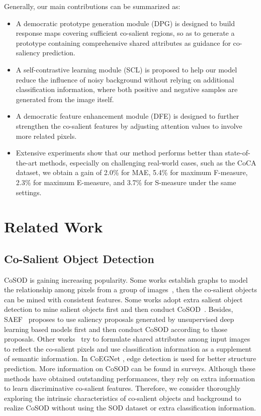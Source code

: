 \documentclass[10pt,twocolumn,letterpaper]{article}
\begin{document}
Generally, our main contributions can be summarized as:
\begin{itemize}
	\item A democratic prototype generation module (DPG) is designed to build response maps covering sufficient co-salient regions, so as to generate a prototype containing comprehensive shared attributes as guidance for co-saliency prediction.
	\item A self-contrastive learning module (SCL) is proposed to help our model reduce the influence of noisy background without relying on additional classification information, where both positive and negative samples are generated from the image itself.
	\item A democratic feature enhancement module (DFE) is designed to further strengthen the co-salient features by adjusting attention values to involve more related pixels.
	\item Extensive experiments show that our method performs better than state-of-the-art methods, especially on challenging real-world cases, such as the CoCA dataset, we obtain a gain of 2.0\% for MAE, 5.4\% for maximum F-measure, 2.3\% for maximum E-measure, and 3.7\% for S-measure under the same settings.
\end{itemize}

\section{Related Work}
\subsection{Co-Salient Object Detection}
CoSOD is gaining increasing popularity. Some works establish graphs to model the relationship among pixels from a group of images~\cite{zhang2020adaptive, jiang2019unified, jiang2020co, hu2021multi, wei2019deep, jiang2019multiple}, then the co-salient objects can be mined with consistent features. Some works adopt extra salient object detection to mine salient objects first and then conduct CoSOD~\cite{zhang2020coadnet, jin2020icnet, zhang2021summarize}. Besides, SAEF~\cite{tsai2019deep} proposes to use saliency proposals generated by unsupervised deep learning based models first and then conduct CoSOD according to those proposals. Other works~\cite{fan2021group, zhang2020gradient, zhang2021deepacg} try to formulate shared attributes among input images to reflect the co-salient pixels and use classification information as a supplement of semantic information. In CoEGNet \cite{deng2021re}, edge detection is used for better structure prediction. More information on CoSOD can be found in surveys\cite{fan2020taking, zhang2018review, cong2018review}. Although these methods have obtained outstanding performances, they rely on extra information to learn discriminative co-salient features. Therefore, we consider thoroughly exploring the intrinsic characteristics of co-salient objects and background to realize CoSOD without using the SOD dataset or extra classification information.
\end{document}
